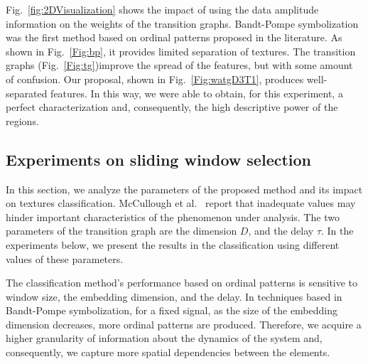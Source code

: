 Fig.~\ref{fig:2DVisualization} shows the impact of using the data amplitude information on the weights of the transition graphs.
Bandt-Pompe symbolization was the first method based on ordinal patterns proposed in the literature.
As shown in Fig.~\ref{Fig:bp}, it provides limited separation of textures.
The transition graphs (Fig.~\ref{Fig:tg})improve the spread of the features, but with some amount of confusion.
Our proposal, shown in Fig.~\ref{Fig:watgD3T1}, produces well-separated features.
In this way, we were able to obtain, for this experiment, a perfect characterization and, consequently, the high descriptive power of the regions.

\subsection{Experiments on sliding window selection}

In this section, we analyze the parameters of the proposed method and its impact on textures classification.
McCullough et al.~\cite{McCullough2015lagged} report that inadequate values may hinder important characteristics of the phenomenon under analysis.
The two parameters of the transition graph are the dimension $D$, and the delay $\tau$.
In the experiments below, we present the results in the classification using different values of these parameters.

The classification method's performance based on ordinal patterns is sensitive to window size, the embedding dimension, and the delay.
In techniques based in Bandt-Pompe symbolization, for a fixed signal, as the size of the embedding dimension decreases, more ordinal patterns are produced.
Therefore, we acquire a higher granularity of information about the dynamics of the system and, consequently, we capture more spatial dependencies between the elements.

